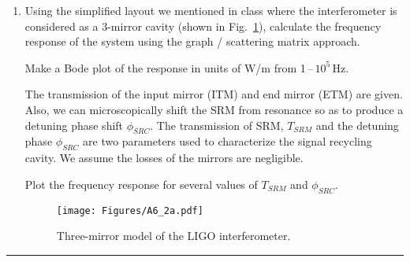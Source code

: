 \documentclass[12pt,twoside]{article}
\begin{document}
\begin{enumerate}
\begin{figure}[ht]
\end{figure}
\begin{enumerate}
\item Using the simplified layout we mentioned in class where the interferometer is considered as a 3-mirror cavity (shown in Fig.~\ref{fig:A6_2a}), calculate the frequency response of the system using the graph / scattering matrix approach.

  Make a Bode plot of the response in units of W/m from 1\,--\,$10^5$\,Hz.

  The transmission of the input mirror (ITM) and end mirror (ETM) are given. Also, we can microscopically shift the SRM from resonance so as to produce a detuning phase shift $\phi_{SRC}$. The transmission of SRM, $T_{SRM}$ and the detuning phase $\phi_{SRC}$ are two parameters used to characterize the signal recycling cavity. We assume the losses of the mirrors are negligible.

Plot the frequency response for several values of $T_{SRM}$ and $\phi_{SRC}$.
  
    \begin{figure}[ht]
    \centering
    \texttt{[image: Figures/A6\_2a.pdf]}
    \caption{Three-mirror model of the LIGO interferometer.}
    \label{fig:A6_2a}
    \end{figure}

\end{enumerate}
\end{enumerate}
\bigskip
{\color{awesome} \hrule}
\end{document}
